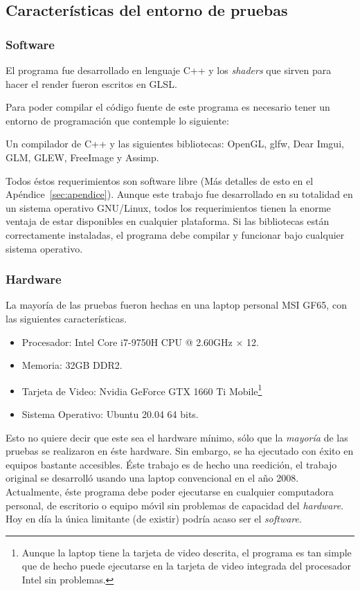 \subsection{Características del entorno de pruebas}

\subsubsection{Software}

El programa fue desarrollado en lenguaje C++ y los \emph{\textenglish{shaders}} que sirven para hacer el render fueron escritos en GLSL.

Para poder compilar el código fuente de este programa es necesario tener un entorno de programación que contemple lo siguiente:

Un compilador de C++ y las siguientes bibliotecas: OpenGL, glfw, Dear Imgui, GLM, GLEW, FreeImage y Assimp.

Todos éstos requerimientos son software libre (Más detalles de esto en el Apéndice~\ref{sec:apendice}).
Aunque este trabajo fue desarrollado en su totalidad en un sistema operativo GNU/Linux, todos los requerimientos tienen la enorme ventaja de estar disponibles en cualquier plataforma.
Si las bibliotecas están correctamente instaladas, el programa debe compilar y funcionar bajo cualquier sistema operativo.

\subsubsection{Hardware}
La mayoría de las pruebas fueron hechas en una laptop personal MSI GF65, con las siguientes características.

\begin{itemize}
\label{maquina:trabajo} 
 \item Procesador: Intel Core i7-9750H CPU @ 2.60GHz $\times$ 12.
 \item Memoria: 32GB DDR2.
 \item Tarjeta de Video: Nvidia GeForce GTX 1660 Ti Mobile\footnote{Aunque la laptop tiene la tarjeta de video descrita, el programa es tan simple que de hecho puede ejecutarse en la tarjeta de video integrada del procesador Intel sin problemas.}
 \item Sistema Operativo: Ubuntu 20.04 64 bits.
\end{itemize}

Esto no quiere decir que este sea el hardware mínimo, sólo que la \emph{mayoría} de las pruebas se realizaron en éste hardware.
Sin embargo, se ha ejecutado con éxito en equipos bastante accesibles. 
Éste trabajo es de hecho una reedición, el trabajo original se desarrolló usando una laptop convencional en el año 2008.
Actualmente, éste programa debe poder ejecutarse en cualquier computadora personal, de escritorio o equipo móvil sin problemas de capacidad del \emph{\textenglish{hardware}}.
Hoy en día la única limitante (de existir) podría acaso ser el \emph{\textenglish{software}}.

